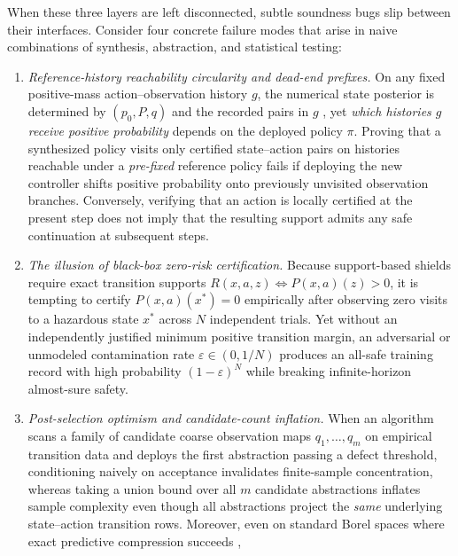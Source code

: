 \documentclass[11pt,a4paper]{article}
\providecommand{\tightlist}{\setlength{\itemsep}{2pt}\setlength{\parskip}{0pt}}
\begin{document}
When these three layers are left disconnected, subtle soundness bugs
slip between their interfaces. Consider four concrete failure modes that
arise in naive combinations of synthesis, abstraction, and statistical
testing:

\begin{enumerate}
\def\labelenumi{\arabic{enumi}.}
\tightlist
\item
  \emph{Reference-history reachability circularity and dead-end
  prefixes.} On any fixed positive-mass action--observation history
  \(g\), the numerical state posterior is determined by \((p_0, P, q)\)
  and the recorded pairs in \(g\)
  \citep{astrom1965, smallwoodSondik1973, kaelbling1998}, yet
  \emph{which histories \(g\) receive positive probability} depends on
  the deployed policy \(\pi\). Proving that a synthesized policy visits
  only certified state--action pairs on histories reachable under a
  \emph{pre-fixed} reference policy fails if deploying the new
  controller shifts positive probability onto previously unvisited
  observation branches. Conversely, verifying that an action is locally
  certified at the present step does not imply that the resulting
  support admits any safe continuation at subsequent steps.
\item
  \emph{The illusion of black-box zero-risk certification.} Because
  support-based shields require exact transition supports
  \(R(x,a,z) \iff P(x,a)(z) > 0\), it is tempting to certify
  \(P(x,a)(x^*) = 0\) empirically after observing zero visits to a
  hazardous state \(x^*\) across \(N\) independent trials. Yet without
  an independently justified minimum positive transition margin, an
  adversarial or unmodeled contamination rate
  \(\varepsilon \in (0, 1/N)\) produces an all-safe training record with
  high probability \((1-\varepsilon)^N\) while breaking infinite-horizon
  almost-sure safety.
\item
  \emph{Post-selection optimism and candidate-count inflation.} When an
  algorithm scans a family of candidate coarse observation maps
  \(q_1, \dots, q_m\) on empirical transition data and deploys the first
  abstraction passing a defect threshold, conditioning naively on
  acceptance invalidates finite-sample concentration, whereas taking a
  union bound over all \(m\) candidate abstractions inflates sample
  complexity even though all abstractions project the \emph{same}
  underlying state--action transition rows. Moreover, even on standard
  Borel spaces where exact predictive compression succeeds
  \citep{crutchfieldYoung1989, shaliziCrutchfield2001, barnettCrutchfield2015},

\end{enumerate}
\end{document}
